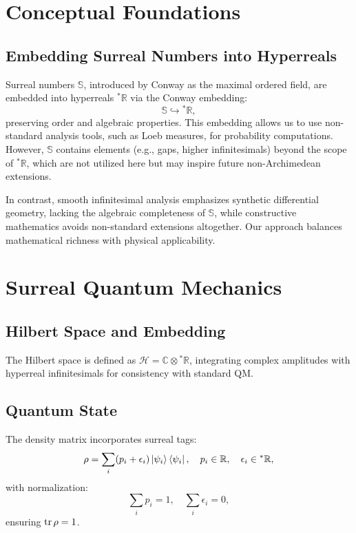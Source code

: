 \documentclass{article}
\begin{document}
\section{Conceptual Foundations}
\subsection{Embedding Surreal Numbers into Hyperreals}
Surreal numbers \(\mathbb{S}\), introduced by Conway as the maximal ordered field, are embedded into hyperreals \({}^*\mathbb{R}\) via the Conway embedding:
\begin{equation}
\mathbb{S} \hookrightarrow {}^*\mathbb{R},
\end{equation}
preserving order and algebraic properties. This embedding allows us to use non-standard analysis tools, such as Loeb measures, for probability computations. However, \(\mathbb{S}\) contains elements (e.g., gaps, higher infinitesimals) beyond the scope of \({}^*\mathbb{R}\), which are not utilized here but may inspire future non-Archimedean extensions.

In contrast, smooth infinitesimal analysis emphasizes synthetic differential geometry, lacking the algebraic completeness of \(\mathbb{S}\), while constructive mathematics avoids non-standard extensions altogether. Our approach balances mathematical richness with physical applicability.

\section{Surreal Quantum Mechanics}
\subsection{Hilbert Space and Embedding}
The Hilbert space is defined as \(\mathcal{H} = \mathbb{C} \otimes {}^*\mathbb{R}\), integrating complex amplitudes with hyperreal infinitesimals for consistency with standard QM.

\subsection{Quantum State}
The density matrix incorporates surreal tags:
\begin{equation}
\rho = \sum_i (p_i + \epsilon_i) \ket{\psi_i}\bra{\psi_i}, \quad p_i \in \mathbb{R}, \quad \epsilon_i \in {}^*\mathbb{R},
\end{equation}
with normalization:
\begin{equation}
\sum_i p_i = 1, \quad \sum_i \epsilon_i = 0,
\end{equation}
ensuring \(\tr \rho = 1\).
\end{document}

